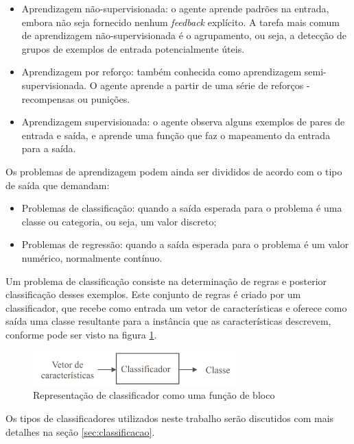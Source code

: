 \begin{itemize}
    \item Aprendizagem não-supervisionada: o agente aprende padrões na entrada, embora não seja fornecido nenhum \textit{feedback} explícito. A tarefa mais comum de aprendizagem não-supervisionada é o agrupamento, ou seja, a detecção de grupos de exemplos de entrada potencialmente úteis.
    \item Aprendizagem por reforço: também conhecida como aprendizagem semi-supervisionada. O agente aprende a partir de uma série de reforços - recompensas ou punições.
    \item Aprendizagem supervisionada: o agente observa alguns exemplos de pares de entrada e saída, e aprende uma função que faz o mapeamento da entrada para a saída.
\end{itemize}

Os problemas de aprendizagem podem ainda ser divididos de acordo com o tipo de saída que demandam:

\begin{itemize}
	\item Problemas de classificação: quando a saída esperada para o problema é uma classe ou categoria, ou seja, um valor discreto;
	\item Problemas de regressão: quando a saída esperada para o problema é um valor numérico, normalmente contínuo.
\end{itemize}

Um problema de classificação consiste na determinação de regras e posterior classificação desses exemplos. Este conjunto de regras é criado por um classificador, que recebe como entrada um vetor de características e oferece como saída uma classe resultante para a instância que as características descrevem, conforme pode ser visto na figura \ref{fig:classificador}.

\begin{figure}[h!]
  \centering
  \includegraphics[width=0.7\textwidth]{imgs/classificador}
  \caption{Representação de classificador como uma função de bloco}
  \label{fig:classificador}
\end{figure}

Os tipos de classificadores utilizados neste trabalho serão discutidos com mais detalhes na seção \ref{sec:classificacao}.

